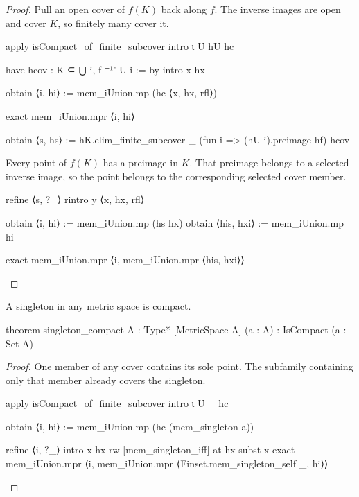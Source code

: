 \begin{proof}
  Pull an open cover of $f(K)$ back along $f$.
  The inverse images are open and cover $K$, so finitely many cover it.

  \begin{lean}
    apply isCompact_of_finite_subcover
    intro ι U hU hc

    have hcov : K ⊆ ⋃ i, f ⁻¹' U i := by
      intro x hx

      obtain ⟨i, hi⟩ := mem_iUnion.mp (hc ⟨x, hx, rfl⟩)

      exact mem_iUnion.mpr ⟨i, hi⟩

    obtain ⟨s, hs⟩ := hK.elim_finite_subcover _ (fun i => (hU i).preimage hf) hcov
  \end{lean}

  Every point of $f(K)$ has a preimage in $K$.
  That preimage belongs to a selected inverse image, so the point belongs to the corresponding
  selected cover member.

  \begin{lean}
    refine ⟨s, ?_⟩
    rintro y ⟨x, hx, rfl⟩

    obtain ⟨i, hi⟩ := mem_iUnion.mp (hs hx)
    obtain ⟨his, hxi⟩ := mem_iUnion.mp hi

    exact mem_iUnion.mpr ⟨i, mem_iUnion.mpr ⟨his, hxi⟩⟩
  \end{lean}

\end{proof}

\begin{lemma}
  \label{an1:lem:singleton-compact}
  A singleton in any metric space is compact.

  \begin{lean}
    theorem singleton_compact {A : Type*} [MetricSpace A] (a : A) :
        IsCompact ({a} : Set A)
  \end{lean}
\end{lemma}

\begin{proof}
  One member of any cover contains its sole point.
  The subfamily containing only that member already covers the singleton.

  \begin{lean}
    apply isCompact_of_finite_subcover
    intro ι U _ hc

    obtain ⟨i, hi⟩ := mem_iUnion.mp (hc (mem_singleton a))

    refine ⟨{i}, ?_⟩
    intro x hx
    rw [mem_singleton_iff] at hx
    subst x
    exact mem_iUnion.mpr ⟨i, mem_iUnion.mpr ⟨Finset.mem_singleton_self _, hi⟩⟩
  \end{lean}

\end{proof}

